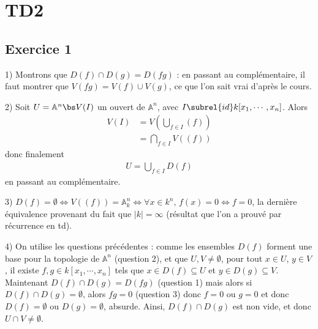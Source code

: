 \chapter{TD2}
    \section{Exercice 1}
        \begin{question}{1)}
            Montrons que $D(f) \cap D(g) = D(fg)$ : en passant au complémentaire, il faut montrer que $V(fg) = V(f) \cup V(g)$, ce que l'on sait vrai d'après le cours.
        \end{question}
        \begin{question}{2)}
            Soit $U = \mathbb{A}^n \bs V(I)$ un ouvert de $\mathbb{A}^n$, avec $I \subrel{id} k[x_1, \cdots, x_n]$. Alors
            \begin{align*}
                V(I) &= V\left( \bigcup_{f \in I} (f) \right) \\
                &= \bigcap_{f \in I} V((f))
            \end{align*}
            donc finalement
            \begin{align*}
                U = \bigcup_{f \in I} D(f)
            \end{align*}
            en passant au complémentaire.
        \end{question}
        \begin{question}{3)}
            $D(f) = \emptyset \iff V((f)) = \mathbb{A}^n_k \iff \forall x \in k^n,\, f(x) = 0 \iff f = 0$, la dernière équivalence provenant du fait que $|k| = \infty$ (résultat que l'on a prouvé par récurrence en td).
        \end{question}
        \begin{question}{4)}
            On utilise les questions précédentes : comme les ensembles $D(f)$ forment une base pour la topologie de $\mathbb{A}^n$ (question 2), et que $U,V \neq \emptyset$, pour tout $x \in U$, $y \in V$, il existe $f,g \in k[x_1, \cdots, x_n]$ tels que $x \in D(f) \subseteq U$ et $y \in D(g) \subseteq V$. Maintenant $D(f) \cap D(g) = D(fg)$ (question 1) mais alors si $D(f) \cap D(g) = \emptyset$, alors $fg = 0$ (question 3) donc $f = 0$ ou $g = 0$ et donc $D(f) = \emptyset$ ou $D(g) = \emptyset$, absurde. Ainsi, $D(f) \cap D(g)$ est non vide, et donc $U \cap V \neq \emptyset$.
        \end{question}

